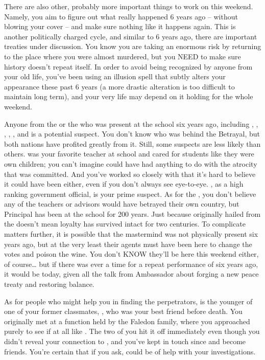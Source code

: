 \documentclass[char]{GL2020}
\begin{document}
There are also other, probably more important things to work on this weekend. Namely, you aim to figure out what really happened 6 years ago -- without blowing your cover -- and make sure nothing like it happens again. This is another politically charged cycle, and similar to 6 years ago, there are important treaties under discussion. You know you are taking an enormous risk by returning to the place where you were almost murdered, but you NEED to make sure history doesn't repeat itself. In order to avoid being recognized by anyone from your old life, you've been using an illusion spell that subtly alters your appearance these past 6 years (a more drastic alteration is too difficult to maintain long term), and your very life may depend on it holding for the whole weekend.

Anyone from the \pTech{} or the \pFarm{} who was present at the school six years ago, including \cDiplomat{\full}, \cHeadScientist{\full}, \cMusic{\full}, \cEthics{\full}, \cLibrarian{\full}, and \cPrincipal{\full} is a potential suspect. You don't know who was behind the Betrayal, but both nations have profited greatly from it. Still, some suspects are less likely than others. \cMusic{} was your favorite teacher at school and \cMusic{\they} cared for \cMusic{\their} students like they were \cMusic{\their} own children; you can't imagine \cMusic{\they} could have had anything to do with the atrocity that was committed. And you've worked so closely with \cHeadScientist{} that it's hard to believe it could have been  \cHeadScientist{\them} either, even if you don't always see eye-to-eye. \cDiplomat{}, as a high ranking government official, is your prime suspect. As for the \pShip{}, you don't believe any of the teachers or advisors would have betrayed their own country, but Principal \cPrincipal{} has been at the school for 200 years. Just because \cPrincipal{\they} originally hailed from the \pShip{} doesn't mean \cPrincipal{\their} loyalty has survived intact for two centuries. To complicate matters further, it is possible that the mastermind was not physically present six years ago, but at the very least their agents must have been here to change the votes and poison the wine. You don't KNOW they'll be here this weekend either, of course\ldots{} but if there was ever a time for a repeat performance of six years ago, it would be today, given all the talk from Ambassador \cHeadDiplomat{\full} about forging a new peace treaty and restoring balance. 

As for people who might help you in finding the perpetrators, \cHeir{\full} is the younger \cHeir{\sibling} of one of your former classmates, \cHeirSibling{\full}, who was your best friend before \cHeirSibling{\their} death. You originally met \cHeir{} at a function held by the Faledon family, where you approached \cHeir{\them} purely to see if \cHeir{\they} \cHeir{\were} at all like \cHeir{\their} \cHeirSibling{\sibling}. The two of you hit it off immediately even though you didn't reveal your connection to \cHeirSibling{}, and you've kept in touch since and become friends. You're certain that if you ask, \cHeir{\they} could be of help with your investigations. 
\end{document}
